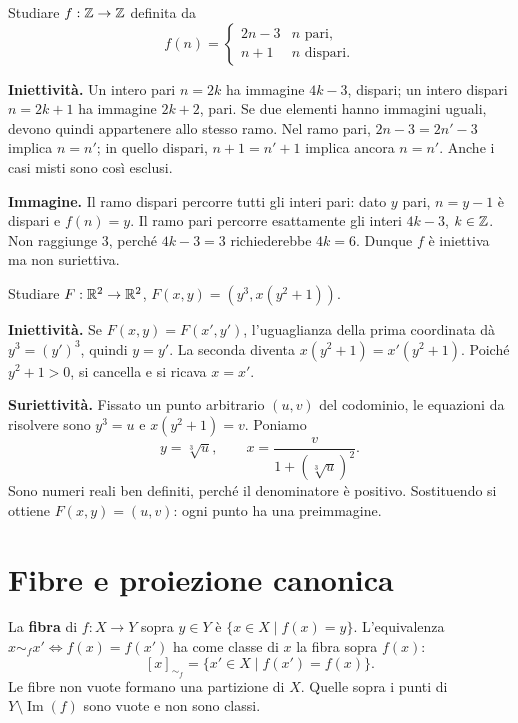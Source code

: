 \begin{esercizio}
Studiare $f:\mathbb{Z}\to\mathbb{Z}$ definita da
\[
f(n)=\begin{cases}2n-3&n\text{ pari},\\n+1&n\text{ dispari}.\end{cases}
\]
\end{esercizio}
\begin{svolgimento}
\textbf{Iniettività.} Un intero pari $n=2k$ ha immagine $4k-3$, dispari; un intero dispari $n=2k+1$ ha immagine $2k+2$, pari. Se due elementi hanno immagini uguali, devono quindi appartenere allo stesso ramo. Nel ramo pari, $2n-3=2n'-3$ implica $n=n'$; in quello dispari, $n+1=n'+1$ implica ancora $n=n'$. Anche i casi misti sono così esclusi.

\textbf{Immagine.} Il ramo dispari percorre tutti gli interi pari: dato $y$ pari, $n=y-1$ è dispari e $f(n)=y$. Il ramo pari percorre esattamente gli interi $4k-3$, $k\in\mathbb{Z}$. Non raggiunge $3$, perché $4k-3=3$ richiederebbe $4k=6$. Dunque $f$ è iniettiva ma non suriettiva.
\end{svolgimento}

\begin{esercizio}
Studiare $F:\mathbb{R}^2\to\mathbb{R}^2$, $F(x,y)=(y^3,x(y^2+1))$.
\end{esercizio}
\begin{svolgimento}
\textbf{Iniettività.} Se $F(x,y)=F(x',y')$, l'uguaglianza della prima coordinata dà $y^3=(y')^3$, quindi $y=y'$. La seconda diventa $x(y^2+1)=x'(y^2+1)$. Poiché $y^2+1>0$, si cancella e si ricava $x=x'$.

\textbf{Suriettività.} Fissato un punto arbitrario $(u,v)$ del codominio, le equazioni da risolvere sono $y^3=u$ e $x(y^2+1)=v$. Poniamo
\[
y=\sqrt[3]u,\qquad x=\frac{v}{1+(\sqrt[3]u)^2}.
\]
Sono numeri reali ben definiti, perché il denominatore è positivo. Sostituendo si ottiene $F(x,y)=(u,v)$: ogni punto ha una preimmagine.
\end{svolgimento}

\section{Fibre e proiezione canonica}
\begin{definizione}
La \textbf{fibra} di $f:X\to Y$ sopra $y\in Y$ è $\{x\in X\mid f(x)=y\}$. L'equivalenza $x\sim_f x'\iff f(x)=f(x')$ ha come classe di $x$ la fibra sopra $f(x)$:
\[
[x]_{\sim_f}=\{x'\in X\mid f(x')=f(x)\}.
\]
Le fibre non vuote formano una partizione di $X$. Quelle sopra i punti di $Y\setminus\operatorname{Im}(f)$ sono vuote e non sono classi.
\end{definizione}

